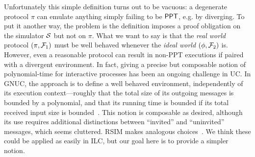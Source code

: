 

Unfortunately this simple definition turns out to be vacuous: a degenerate
protocol $\pi$ can emulate anything simply failing to be $\text{\textsf{PPT}}$, e.g. by
diverging. To put it another way, the problem is the definition imposes a proof
obligation on the simulator $\mathcal{{S}}$ but not on $\pi$.  What we want to say is
that the \emph{real world} protocol $(\pi, \mathcal{{F}}_1)$ must be well behaved
whenever the \emph{ideal world} $(\phi, \mathcal{{F}}_2)$ is.  However, even a reasonable
protocol can result in non-PPT executions if paired with a divergent
environment.  In fact, giving a precise but composable notion of polynomial-time
for interactive processes has been an ongoing challenge in UC. In GNUC, the
approach is to define a well behaved environment, independently of its execution
context---roughly that the total size of its outgoing messages is bounded by a
polynomial, and that its running time is bounded if its total received input
size is bounded~\cite{hofheinz2015gnuc}. This notion is composable as desired,
although its use requires additional distinctions between ``invited'' and
``uninvited'' messages, which seems cluttered. RSIM makes analogous
choices~\cite{backes2007reactive}. We think these could be applied as easily in
ILC, but our goal here is to provide a simpler notion.

